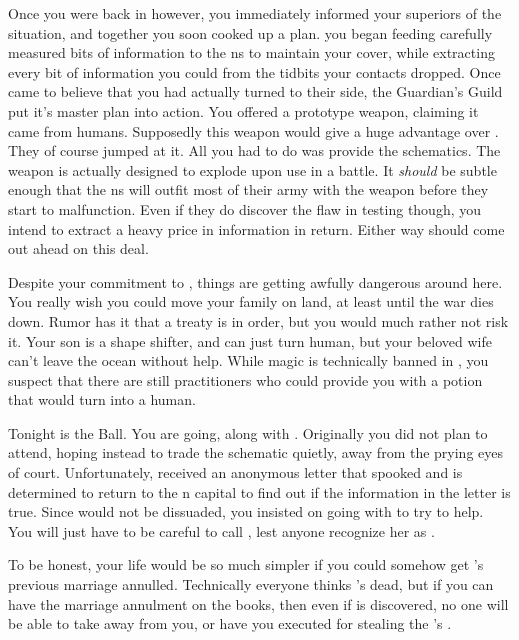 \documentclass[char]{NeptuneBall}
\begin{document}
Once you were back in \pAtlantis{} however, you immediately informed your superiors of the situation, and together you soon cooked up a plan. you began feeding carefully measured bits of information to the \pPacifica{}ns to maintain your cover, while extracting every bit of information you could from the tidbits your contacts dropped. Once \pPacifica{} came to believe that you had actually turned to their side, the Guardian's Guild put it's master plan into action. You offered \pPacifica{} a prototype weapon, claiming it came from humans. Supposedly this weapon would give \pPacifica{} a huge advantage over \pAtlantis{}. They of course jumped at it.  All you had to do was provide the schematics. The weapon is actually designed to explode upon use in a battle. It \emph{should} be subtle enough that the \pPacifica{}ns will outfit most of their army with the weapon before they start to malfunction. Even if they do discover the flaw in testing though, you intend to extract a heavy price in information in return. Either way \pAtlantis{} should come out ahead on this deal.

Despite your commitment to \pAtlantis{}, things are getting awfully dangerous around here. You really wish you could move your family on land, at least until the war dies down. Rumor has it that a treaty is in order, but you would much rather not risk it. Your son is a shape shifter, and can just turn human, but your beloved wife \cQueen{} can't leave the ocean without help. While magic is technically banned in \pAtlantis{}, you suspect that there are still practitioners who could provide you with a potion that would turn \cQueen{} into a human.

Tonight is the \cExExKing{} Ball. You are going, along with \cQueen{}. Originally you did not plan to attend, hoping instead to trade the schematic quietly, away from the prying eyes of court. Unfortunately, \cQueen{} received an anonymous letter that spooked \cQueen{\them} and \cQueen{\they} is determined to return to the \pAtlantis{}n capital to find out if the information in the letter is true. Since \cQueen{\they} would not be dissuaded, you insisted on going with \cQueen{\them} to try to help. You will just have to be careful to call \cQueen{\them} \cQueen{\MYname}, lest anyone recognize her as \cQueen{\King}.

To be honest, your life would be so much simpler if you could somehow get \cQueen{}'s previous marriage annulled. Technically everyone thinks \cQueen{\they}'s dead, but if you can have the marriage annulment on the books, then even if \cQueen{} is discovered, no one will be able to take \cQueen{\them} away from you, or have you executed for stealing the \cKing{\King}'s \cQueen{\spouse}.
\end{document}

